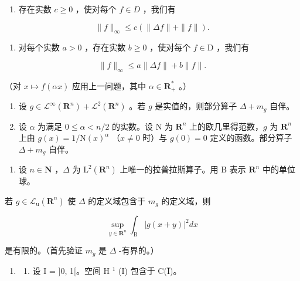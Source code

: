 \begin{enumerate}
\def\labelenumi{\alph{enumi})}
\tightlist
\item
  存在实数 \(c \geqslant 0\) ，使对每个 \(f \in D\) ，我们有
\end{enumerate}

\[
\| f \| _ {\infty} \leqslant c (\| \Delta f \| + \| f \|).
\]

\begin{enumerate}
\def\labelenumi{\alph{enumi})}
\setcounter{enumi}{1}
\tightlist
\item
  对每个实数 \(a > 0\) ，存在实数 \(b \geqslant 0\) ，使对每个 \(f \in \mathrm{D}\) ，我们有
\end{enumerate}

\[
\| f \| _ {\infty} \leqslant a \| \Delta f \| + b \| f \|.
\]

（对 \(x \mapsto f(\alpha x)\) 应用上一问题，其中 \(\alpha \in \mathbf{R}_{+}^{*}\) 。）

\begin{enumerate}
\def\labelenumi{\alph{enumi})}
\setcounter{enumi}{2}
\item
  设 \(g \in \mathcal{L}^{\infty}(\mathbf{R}^{n}) + \mathcal{L}^{2}(\mathbf{R}^{n})\) 。若 \(g\) 是实值的，则部分算子 \(\Delta + m_{g}\) 自伴。
\item
  设 \(\alpha\) 为满足 \(0 \leqslant \alpha < n/2\) 的实数。设 N 为 \(\mathbf{R}^n\) 上的欧几里得范数，\(g\) 为 \(\mathbf{R}^n\) 上由 \(g(x) = 1/\mathrm{N}(x)^\alpha\) （\(x \neq 0\) 时）与 \(g(0) = 0\) 定义的函数。部分算子 \(\Delta + m_g\) 自伴。
\end{enumerate}

\begin{enumerate}
\def\labelenumi{\arabic{enumi})}
\setcounter{enumi}{14}
\tightlist
\item
  设 \(n \in \mathbf{N}\) ，\(\Delta\) 为 \(\mathrm{L}^2(\mathbf{R}^n)\) 上唯一的拉普拉斯算子。用 B 表示 \(\mathbf{R}^n\) 中的单位球。
\end{enumerate}

若 \(g \in \mathcal{L}_{\mathrm{u}}(\mathbf{R}^{n})\) 使 \(\Delta\) 的定义域包含于 \(m_{g}\) 的定义域，则

\[
\sup _ {y \in \mathbf {R} ^ {n}} \int_ {\mathrm{B}} | g (x + y) | ^ {2} d x
\]

是有限的。（首先验证 \(m_{g}\) 是 \(\Delta\) -有界的。）

\begin{enumerate}
\def\labelenumi{\arabic{enumi})}
\setcounter{enumi}{15}
\tightlist
\item
  \begin{enumerate}
  \def\labelenumii{\alph{enumii})}
  \tightlist
  \item
    设 I = {]}0, 1{[}。空间 H \(^{1}\) (I) 包含于 C(Ī)。
  \end{enumerate}
\end{enumerate}

